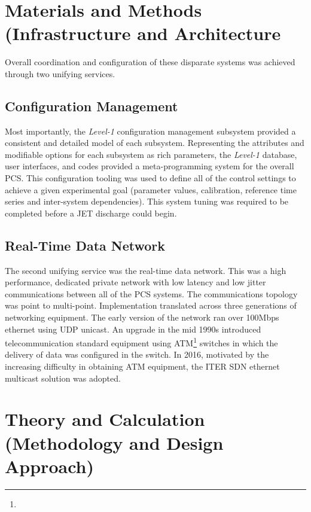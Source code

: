 \documentclass[preprint,12pt]{elsarticle}
\begin{document}
\section{Materials and Methods (Infrastructure and Architecture}

Overall coordination and configuration of these disparate systems was achieved through two unifying services.

\subsection{Configuration Management}

  Most importantly, the {\em Level-1} configuration management subsystem provided a consistent and detailed model of each subsystem. Representing the attributes and modifiable options for each subsystem as rich parameters, the {\em Level-1} database, user interfaces, and codes provided a meta-programming system for the overall PCS.  This configuration tooling was
used to define all of the control settings to achieve a given experimental goal (parameter values, calibration, reference time series and inter-system dependencies).  This system tuning was required to be completed before a JET discharge could begin.  

\subsection{Real-Time Data Network}

The second unifying service was the real-time data network. This was a high performance, dedicated private network with low latency and low jitter communications between all of the PCS systems.  The communications topology was point to multi-point. Implementation translated across three generations of networking equipment.  The early version of the network ran over 100Mbps ethernet using UDP unicast. An upgrade in the mid 1990s introduced telecommunication standard equipment using ATM\footnote{} switches in which the delivery of data was configured in the switch. In 2016, motivated by the increasing difficulty in obtaining ATM equipment, the ITER SDN ethernet multicast solution was adopted.

\section{Theory and Calculation (Methodology and Design Approach)}
\end{document}
